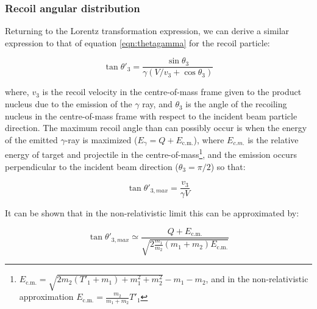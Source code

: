 \subsubsection{Recoil angular distribution}

Returning to the Lorentz transformation expression, we can derive a similar expression to that of equation \ref{eqn:thetagamma} for the recoil particle:

\begin{equation}
\tan{\theta'_{3}} = \frac{\sin{\theta_{3}}}{\gamma(V/v_{3}+\cos{\theta_{3}})}
\end{equation}

where, $v_{3}$ is the recoil velocity in the centre-of-mass frame given to the product nucleus due to the emission of the $\gamma$ ray, and $\theta_{3}$ is the angle of the recoiling nucleus in the centre-of-mass frame with respect to the incident beam particle direction. The maximum recoil angle than can possibly occur is when the energy of the emitted $\gamma$-ray is maximized ($E_{\gamma}=Q+E_{\mathrm{c.m.}}$), where $E_{c.m.}$ is the relative energy of target and projectile in the centre-of-mass\footnote{ $E_\mathrm{c.m.}=\sqrt{2m_{2}(T'_{1}+m_{1})+m_{1}^{2}+m_{2}^{2}}-m_{1}-m_{2}$, and in the non-relativistic approximation $E_\mathrm{c.m.}=\frac{m_{2}}{m_{1}+m_{2}}T'_{1}$ }, and the emission occurs perpendicular to the incident beam direction ($\theta_{3}=\pi/2$) so that:

\begin{equation}
\tan{\theta'_{3,max}}=\frac{v_{3}}{\gamma V}
\end{equation} 

It can be shown that in the non-relativistic limit this can be approximated by:

\begin{equation} \label{eq:6}
\tan{\theta'_{3,max}}\simeq\frac{Q+E_\mathrm{c.m.}}{\sqrt{2\frac{m_{1}}{m_{2}}(m_{1}+m_{2})E_\mathrm{c.m.}}}
\end{equation}

